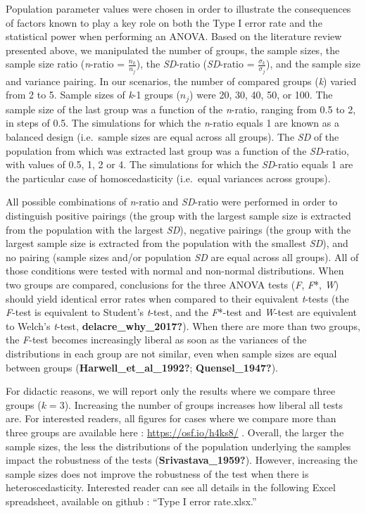 \documentclass[
  english,
  man]{apa6}
\begin{document}
Population parameter values were chosen in order to illustrate the consequences of factors known to play a key role on both the Type I error rate and the statistical power when performing an ANOVA. Based on the literature review presented above, we manipulated the number of groups, the sample sizes, the sample size ratio (\emph{n}-ratio = \(\frac{n_k}{n_j}\)), the \emph{SD}-ratio (\emph{SD}-ratio = \(\frac{\sigma_k}{\sigma_j}\)), and the sample size and variance pairing. In our scenarios, the number of compared groups (\emph{k}) varied from 2 to 5. Sample sizes of \emph{k}-1 groups (\(n_j\)) were 20, 30, 40, 50, or 100. The sample size of the last group was a function of the \emph{n}-ratio, ranging from 0.5 to 2, in steps of 0.5. The simulations for which the \emph{n}-ratio equals 1 are known as a balanced design (i.e.~sample sizes are equal across all groups). The \emph{SD} of the population from which was extracted last group was a function of the \emph{SD}-ratio, with values of 0.5, 1, 2 or 4. The simulations for which the \emph{SD}-ratio equals 1 are the particular case of homoscedasticity (i.e.~equal variances across groups).

All possible combinations of \emph{n}-ratio and \emph{SD}-ratio were performed in order to distinguish positive pairings (the group with the largest sample size is extracted from the population with the largest \emph{SD}), negative pairings (the group with the largest sample size is extracted from the population with the smallest \emph{SD}), and no pairing (sample sizes and/or population \emph{SD} are equal across all groups). All of those conditions were tested with normal and non-normal distributions. When two groups are compared, conclusions for the three ANOVA tests (\emph{F}, \emph{F}*, \emph{W}) should yield identical error rates when compared to their equivalent \emph{t}-tests (the \emph{F}-test is equivalent to Student's \emph{t}-test, and the \emph{F}*-test and \emph{W}-test are equivalent to Welch's \emph{t}-test, \textbf{delacre\_why\_2017?}). When there are more than two groups, the \emph{F}-test becomes increasingly liberal as soon as the variances of the distributions in each group are not similar, even when sample sizes are equal between groups (\textbf{Harwell\_et\_al\_1992?}; \textbf{Quensel\_1947?}).

For didactic reasons, we will report only the results where we compare three groups (\(k = 3\)). Increasing the number of groups increases how liberal all tests are. For interested readers, all figures for cases where we compare more than three groups are available here : \url{https://osf.io/h4ks8/} . Overall, the larger the sample sizes, the less the distributions of the population underlying the samples impact the robustness of the tests (\textbf{Srivastava\_1959?}). However, increasing the sample sizes does not improve the robustness of the test when there is heteroscedasticity. Interested reader can see all details in the following Excel spreadsheet, available on github : ``Type I error rate.xlsx.''
\end{document}
